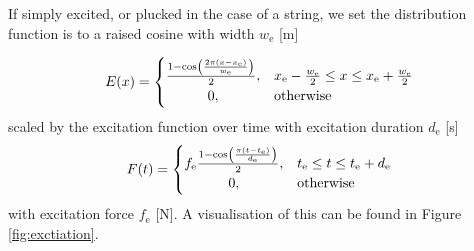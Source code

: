 \documentclass{article}
\begin{document}
If simply excited, or plucked in the case of a string, we set the distribution function is to a raised cosine with width $w_\text{e}$ [m]

\begin{equation} \label{eq:distribution}
    E(x) = 
    \begin{cases}
        \hfil \frac{1 - \cos(\frac{2 \pi (x - x_\text{e})}{w_\text{e}})}{2}, & x_\text{e} -  \frac{w_\text{e}}{2} \leq x \leq x_\text{e} + \frac{w_\text{e}}{2} \\
        \hfil 0, &\text{otherwise}
    \end{cases}
\end{equation}
scaled by the excitation function over time with excitation duration $d_\text{e}$ [s]
\begin{equation}\label{eq:excitation}
    F(t) = 
    \begin{cases}
        f_\text{e}\frac{1 - \cos(\frac{\pi (t - t_\text{e})}{d_\text{e}})}{2}, & t_\text{e} \leq t \leq t_\text{e}+d_\text{e}\\
        \hfil 0, &\text{otherwise}
    \end{cases}
\end{equation}
with excitation force $f_\text{e}$ [N]. 
A visualisation of this can be found in Figure \ref{fig:exctiation}.



\end{document}
